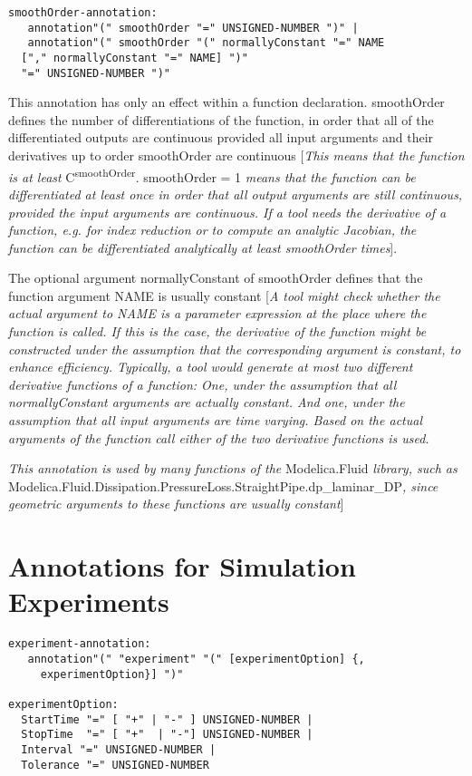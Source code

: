\begin{lstlisting}[language=grammar]
smoothOrder-annotation:
   annotation"(" smoothOrder "=" UNSIGNED-NUMBER ")" |
   annotation"(" smoothOrder "(" normallyConstant "=" NAME
  ["," normallyConstant "=" NAME] ")"
  "=" UNSIGNED-NUMBER ")"
\end{lstlisting}
This annotation has only an effect within a function declaration.
smoothOrder defines the number of differentiations of the function, in
order that all of the differentiated outputs are continuous provided all
input arguments and their derivatives up to order smoothOrder are
continuous {[}\emph{This means that the function is at least}
C\textsuperscript{smoothOrder}. smoothOrder = 1 \emph{means that the
function can be differentiated at least once in order that all output
arguments are still continuous, provided the input arguments are
continuous. If a tool needs the derivative of a function, e.g. for index
reduction or to compute an analytic Jacobian, the function can be
differentiated analytically at least smoothOrder times}{]}.

The optional argument normallyConstant of smoothOrder defines that the
function argument NAME is usually constant {[}\emph{A tool might check
whether the actual argument to NAME is a parameter expression at the
place where the function is called. If this is the case, the derivative
of the function might be constructed under the assumption that the
corresponding argument is constant, to enhance efficiency. Typically, a
tool would generate at most two different derivative functions of a
function: One, under the assumption that all normallyConstant arguments
are actually constant. And one, under the assumption that all input
arguments are time varying. Based on the actual arguments of the
function call either of the two derivative functions is used.}

\emph{This annotation is used by many functions of the} Modelica.Fluid
\emph{library, such as}
Modelica\allowbreak{}.Fluid\allowbreak{}.Dissipation\allowbreak{}.PressureLoss\allowbreak{}.StraightPipe\allowbreak{}.dp\_laminar\_DP\emph{,
since geometric arguments to these functions are usually constant}{]}

\section{Annotations for Simulation Experiments}
\begin{lstlisting}[language=grammar]
experiment-annotation:
   annotation"(" "experiment" "(" [experimentOption] {,
     experimentOption}] ")"

experimentOption:
  StartTime "=" [ "+" | "-" ] UNSIGNED-NUMBER |
  StopTime  "=" [ "+"  | "-"] UNSIGNED-NUMBER |
  Interval "=" UNSIGNED-NUMBER |
  Tolerance "=" UNSIGNED-NUMBER
\end{lstlisting}

